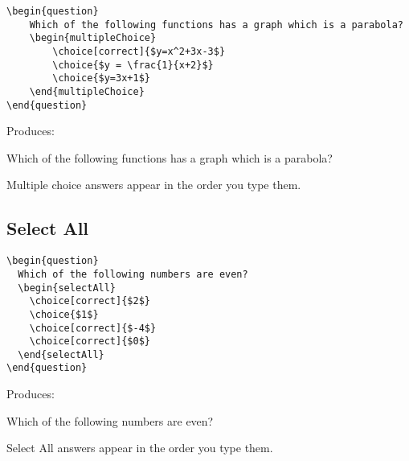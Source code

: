 \documentclass{ximera}
\begin{document}
\begin{verbatim}
\begin{question}
	Which of the following functions has a graph which is a parabola?
	\begin{multipleChoice}
		\choice[correct]{$y=x^2+3x-3$}
		\choice{$y = \frac{1}{x+2}$}
		\choice{$y=3x+1$}
	\end{multipleChoice}
\end{question}
\end{verbatim}

Produces:

\begin{question}
  Which of the following functions has a graph which is a parabola?
  \begin{multipleChoice}
  \end{multipleChoice}
\end{question}

\begin{remark}
  Multiple choice answers appear in the order you type them. 
\end{remark}


\subsection{Select All}

\begin{verbatim}
\begin{question}
  Which of the following numbers are even?
  \begin{selectAll}
    \choice[correct]{$2$}
    \choice{$1$}
    \choice[correct]{$-4$}
    \choice[correct]{$0$}
  \end{selectAll}
\end{question}
\end{verbatim}

Produces:

\begin{question}
  Which of the following numbers are even?
  \begin{selectAll}
  \end{selectAll}
\end{question}

\begin{remark}
  Select All answers appear in the order you type them. 
\end{remark}
\end{document}

